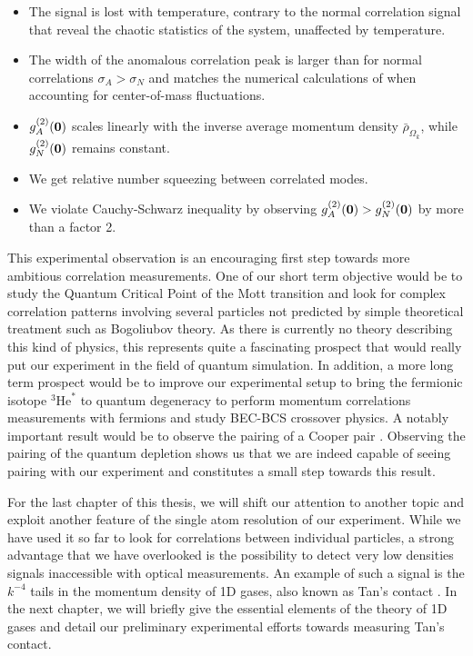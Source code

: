 \begin{itemize}
\begin{itemize}
        \item The signal is lost with temperature, contrary to the normal correlation signal that reveal the chaotic statistics of the system, unaffected by temperature.
        \item The width of the anomalous correlation peak is larger than for normal correlations $\sigma_A > \sigma_N$ and matches the numerical calculations of \cite{butera2020} when accounting for center-of-mass fluctuations.
        \item $g^{(2)}_A(\bm{0})$ scales linearly with the inverse average momentum density $\bar{\rho}_{\Omega_k}$, while $g^{(2)}_N(\bm{0})$ remains constant.
        \item We get relative number squeezing between correlated modes.
        \item We violate Cauchy-Schwarz inequality by observing $g^{(2)}_A(\bm{0}) > g^{(2)}_N(\bm{0})$ by more than a factor 2.
        
    \end{itemize}
\end{itemize}

This experimental observation is an encouraging first step towards more ambitious correlation measurements. One of our short term objective would be to study the Quantum Critical Point of the Mott transition and look for complex correlation patterns involving several particles not predicted by simple theoretical treatment such as Bogoliubov theory. As there is currently no theory describing this kind of physics, this represents quite a fascinating prospect that would really put our experiment in the field of quantum simulation. In addition, a more long term prospect would be to improve our experimental setup to bring the fermionic isotope $^3 \mathrm{He}^*$ to quantum degeneracy to perform momentum correlations measurements with fermions and study BEC-BCS crossover physics. A notably important result would be to observe the \kmk pairing of a Cooper pair \cite{cooper1956bound}. Observing the \kmk pairing of the quantum depletion shows us that we are indeed capable of seeing \kmk pairing with our experiment and constitutes a small step towards this result.

For the last chapter of this thesis, we will shift our attention to another topic and exploit another feature of the single atom resolution of our experiment. While we have used it so far to look for correlations between individual particles, a strong advantage that we have overlooked is the possibility to detect very low densities signals inaccessible with optical measurements. An example of such a signal is the $k^{-4}$ tails in the momentum density of 1D gases, also known as Tan's contact \cite{tan2008large}. In the next chapter, we will briefly give the essential elements of the theory of 1D gases and detail our preliminary experimental efforts towards measuring Tan's contact.

